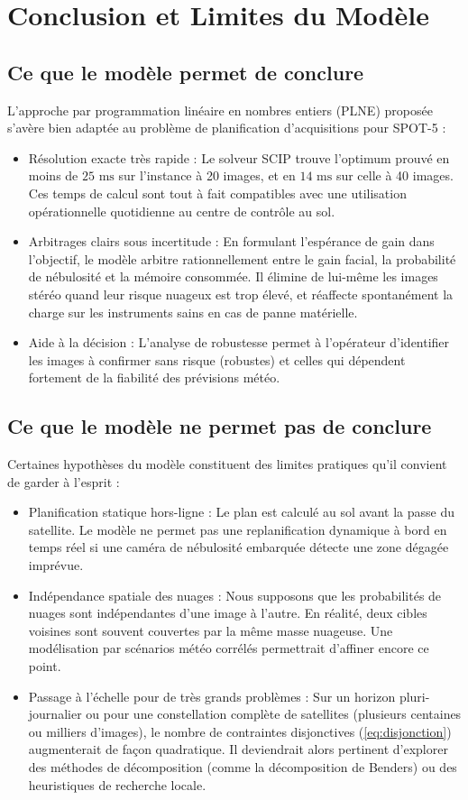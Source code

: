 \section{Conclusion et Limites du Modèle}

\subsection{Ce que le modèle permet de conclure}
L'approche par programmation linéaire en nombres entiers (PLNE) proposée s'avère bien adaptée au problème de planification d'acquisitions pour SPOT-5 :
\begin{itemize}
    \item Résolution exacte très rapide : Le solveur SCIP trouve l'optimum prouvé en moins de $25\text{ ms}$ sur l'instance à 20 images, et en $14\text{ ms}$ sur celle à 40 images. Ces temps de calcul sont tout à fait compatibles avec une utilisation opérationnelle quotidienne au centre de contrôle au sol.
    \item Arbitrages clairs sous incertitude : En formulant l'espérance de gain dans l'objectif, le modèle arbitre rationnellement entre le gain facial, la probabilité de nébulosité et la mémoire consommée. Il élimine de lui-même les images stéréo quand leur risque nuageux est trop élevé, et réaffecte spontanément la charge sur les instruments sains en cas de panne matérielle.
    \item Aide à la décision : L'analyse de robustesse permet à l'opérateur d'identifier les images à confirmer sans risque (robustes) et celles qui dépendent fortement de la fiabilité des prévisions météo.
\end{itemize}

\subsection{Ce que le modèle ne permet pas de conclure}
Certaines hypothèses du modèle constituent des limites pratiques qu'il convient de garder à l'esprit :
\begin{itemize}
    \item Planification statique hors-ligne : Le plan est calculé au sol avant la passe du satellite. Le modèle ne permet pas une replanification dynamique à bord en temps réel si une caméra de nébulosité embarquée détecte une zone dégagée imprévue.
    \item Indépendance spatiale des nuages : Nous supposons que les probabilités de nuages sont indépendantes d'une image à l'autre. En réalité, deux cibles voisines sont souvent couvertes par la même masse nuageuse. Une modélisation par scénarios météo corrélés permettrait d'affiner encore ce point.
    \item Passage à l'échelle pour de très grands problèmes : Sur un horizon pluri-journalier ou pour une constellation complète de satellites (plusieurs centaines ou milliers d'images), le nombre de contraintes disjonctives (\ref{eq:disjonction}) augmenterait de façon quadratique. Il deviendrait alors pertinent d'explorer des méthodes de décomposition (comme la décomposition de Benders) ou des heuristiques de recherche locale.
\end{itemize}
